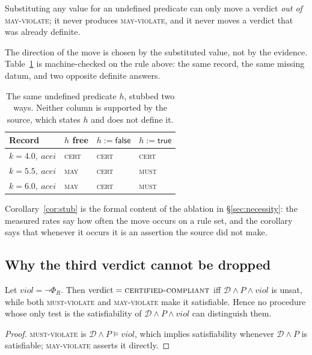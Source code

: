 \begin{corollary}
\label{cor:stub}
Substituting any value for an undefined predicate can only move a verdict
\emph{out of} \textsc{may-violate}; it never produces \textsc{may-violate}, and
it never moves a verdict that was already definite.
\end{corollary}

The direction of the move is chosen by the substituted value, not by the
evidence. Table~\ref{tab:stub-machine} is machine-checked on the rule above:
the same record, the same missing datum, and two opposite definite answers.

\begin{table}[h]
  \centering
  \caption{The same undefined predicate $h$, stubbed two ways. Neither column is
  supported by the source, which states $h$ and does not define it.}
  \label{tab:stub-machine}
  \begin{tabular}{llll}
    \toprule
    Record & $h$ free & $h := \textsf{false}$ & $h := \textsf{true}$ \\
    \midrule
    $k=4.0,\ \mathit{acei}$ & \textsc{cert} & \textsc{cert} & \textsc{cert} \\
    $k=5.5,\ \mathit{acei}$ & \textsc{may}  & \textsc{cert} & \textsc{must} \\
    $k=6.0,\ \mathit{acei}$ & \textsc{may}  & \textsc{cert} & \textsc{must} \\
    \bottomrule
  \end{tabular}
\end{table}

Corollary~\ref{cor:stub} is the formal content of the ablation in
\S\ref{sec:necessity}: the measured rates say how often the move occurs on a
rule set, and the corollary says that whenever it occurs it is an assertion the
source did not make.

\subsection{Why the third verdict cannot be dropped}

\begin{proposition}
\label{prop:onequery}
Let $\mathit{viol} = \neg\Phi_R$. Then
$\mathrm{verdict} = \textsc{certified-compliant}$ iff
$\mathcal{D}\wedge P\wedge \mathit{viol}$ is unsat, while both
\textsc{must-violate} and \textsc{may-violate} make it satisfiable. Hence no
procedure whose only test is the satisfiability of
$\mathcal{D}\wedge P\wedge \mathit{viol}$ can distinguish them.
\end{proposition}
\begin{proof}
\textsc{must-violate} is $\mathcal{D}\wedge P \models \mathit{viol}$, which
implies satisfiability whenever $\mathcal{D}\wedge P$ is satisfiable;
\textsc{may-violate} asserts it directly.
\end{proof}

